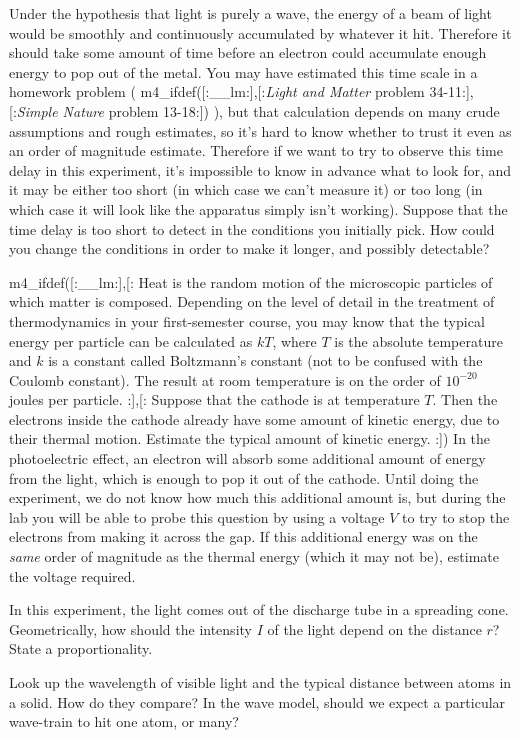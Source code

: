 \prelab

\prelabquestion Under the hypothesis that light is purely a wave, the energy of a beam of
light would be smoothly and continuously accumulated by whatever it hit. Therefore it should
take some amount of time before an electron could accumulate enough energy to pop out of the metal.
You may have estimated this time scale in a homework problem
(%
m4_ifdef([:__lm:],[:\emph{Light and Matter} problem 34-11:],[:\emph{Simple Nature} problem 13-18:])%
),
 but that calculation depends on many crude assumptions and rough
estimates, so it's hard to know whether to trust it even as an order of magnitude estimate.
Therefore if we want to try to observe this time delay in this experiment, it's impossible to
know in advance what to look for, and it may be either too short (in which case we can't measure
it) or too long (in which case it will look like the apparatus simply isn't working). Suppose
that the time delay is too short to detect in the conditions you initially pick. How could
you change the conditions in order to make it longer, and possibly detectable?

\prelabquestion m4_ifdef([:__lm:],[:
Heat is the random motion of the microscopic particles of which matter is composed. Depending on the
level of detail in the treatment of thermodynamics in your first-semester course, you may know that the
typical energy per particle can be calculated as $kT$, where $T$ is the absolute temperature and $k$ is
a constant called Boltzmann's constant (not to be confused with the Coulomb constant). The result at
room temperature is on the order of $10^{-20}$ joules per particle.
:],[:
Suppose that the cathode is at temperature $T$. Then the electrons inside the cathode
already have some amount of kinetic energy, due to their thermal motion. Estimate the typical amount
of kinetic energy.
:])%
In the photoelectric effect, an electron will absorb some additional amount of
energy from the light, which is enough to pop it out of the cathode. Until doing the experiment,
we do not know how much this additional amount is, but during the lab you will be able to probe this
question by using a voltage $V$ to try to stop the electrons from making it across the gap. If
this additional energy was on the \emph{same} order of magnitude as the thermal energy (which it may not
be), estimate the voltage required.

\prelabquestion In this experiment, the light comes out of the discharge tube in a spreading cone.
Geometrically, how should the intensity $I$ of the light depend on the distance $r$? State a proportionality.

\prelabquestion Look up the wavelength of visible light and the typical distance between atoms in a solid.
How do they compare? In the wave model, should we expect a particular wave-train to hit one atom, or many?

